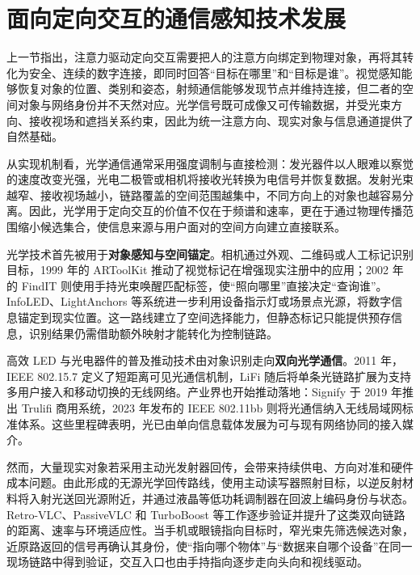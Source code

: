 \section{面向定向交互的通信感知技术发展}
上一节指出，注意力驱动定向交互需要把人的注意方向绑定到物理对象，再将其转化为安全、连续的数字连接，即同时回答“目标在哪里”和“目标是谁”。视觉感知能够恢复对象的位置、类别和姿态，射频通信能够发现节点并维持连接，但二者的空间对象与网络身份并不天然对应。光学信号既可成像又可传输数据，并受光束方向、接收视场和遮挡关系约束，因此为统一注意方向、现实对象与信息通道提供了自然基础。

从实现机制看，光学通信通常采用强度调制与直接检测：发光器件以人眼难以察觉的速度改变光强，光电二极管或相机将接收光转换为电信号并恢复数据。发射光束越窄、接收视场越小，链路覆盖的空间范围越集中，不同方向上的对象也越容易分离。因此，光学用于定向交互的价值不仅在于频谱和速率，更在于通过物理传播范围缩小候选集合，使信息来源与用户面对的空间方向建立直接联系。

光学技术首先被用于\textbf{对象感知与空间锚定}。相机通过外观、二维码或人工标记识别目标，1999 年的 ARToolKit 推动了视觉标记在增强现实注册中的应用\supercite{artoolkit_1999}；2002 年的 FindIT 则使用手持光束唤醒匹配标签，使“照向哪里”直接决定“查询谁”\supercite{findit}。InfoLED、LightAnchors 等系统进一步利用设备指示灯或场景点光源，将数字信息锚定到现实位置\supercite{infoled,lightanchors}。这一路线建立了空间选择能力，但静态标记只能提供预存信息，识别结果仍需借助额外映射才能转化为控制链路。

高效 LED 与光电器件的普及推动技术由对象识别走向\textbf{双向光学通信}。2011 年，IEEE 802.15.7 定义了短距离可见光通信机制，LiFi 随后将单条光链路扩展为支持多用户接入和移动切换的无线网络\supercite{ieee_802_15_7,what_is_lifi}。产业界也开始推动落地：Signify 于 2019 年推出 Trulifi 商用系统，2023 年发布的 IEEE 802.11bb 则将光通信纳入无线局域网标准体系\supercite{signify_trulifi,ieee_802_11bb}。这些里程碑表明，光已由单向信息载体发展为可与现有网络协同的接入媒介。

然而，大量现实对象若采用主动光发射器回传，会带来持续供电、方向对准和硬件成本问题。由此形成的无源光学回传路线，使用主动读写器照射目标，以逆反射材料将入射光送回光源附近，并通过液晶等低功耗调制器在回波上编码身份与状态。Retro-VLC、PassiveVLC 和 TurboBoost 等工作逐步验证并提升了这类双向链路的距离、速率与环境适应性\supercite{retrovlc,passivevlc,turboboost}。当手机或眼镜指向目标时，窄光束先筛选候选对象，近原路返回的信号再确认其身份，使“指向哪个物体”与“数据来自哪个设备”在同一现场链路中得到验证，交互入口也由手持指向逐步走向头向和视线驱动。

